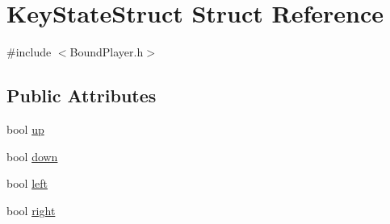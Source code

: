 \hypertarget{struct_key_state_struct}{\section{\-Key\-State\-Struct \-Struct \-Reference}
\label{struct_key_state_struct}
}


{\ttfamily \#include $<$\-Bound\-Player.\-h$>$}

\subsection*{\-Public \-Attributes}
\begin{DoxyCompactItemize}
\item 
bool \hyperlink{struct_key_state_struct_a3d388e2382b981fef46bd0ac827f9a41}{up}
\item 
bool \hyperlink{struct_key_state_struct_aeda151e7db716720d5908f71bbebd762}{down}
\item 
bool \hyperlink{struct_key_state_struct_a58af8e4068bce6dd66a29ba2b51ed96b}{left}
\item 
bool \hyperlink{struct_key_state_struct_a4edc7213073c8090360733c06949e3cd}{right}
\end{DoxyCompactItemize}


